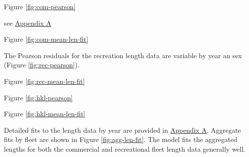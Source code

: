 \documentclass[11pt,
  english,
  a4paper,
]{article}
\begin{document}
Figure \ref{fig:com-pearson}

\leavevmode\tagmcend\tagstructend\par


see {\protect\hyperlink{append_aux5cux2520forux5cux2520details}{Appendix A}\leavevmode\tagmcend\tagstructend}

\leavevmode\tagmcend\tagstructend\par


Figure \ref{fig:com-mean-len-fit}

\leavevmode\tagmcend\tagstructend\par


The Pearson residuals for the recreation length data are variable by year an sex (Figure \ref{fig:rec-pearson}).

\leavevmode\tagmcend\tagstructend\par


Figure \ref{fig:rec-mean-len-fit}

\leavevmode\tagmcend\tagstructend\par


Figure \ref{fig:hkl-pearson}

\leavevmode\tagmcend\tagstructend\par


Figure \ref{fig:hkl-mean-len-fit}

\leavevmode\tagmcend\tagstructend\par


Detailed fits to the length data by year are provided in {\protect\hyperlink{append_a}{Appendix A}\leavevmode\tagmcend\tagstructend}. Aggregate fits by fleet are shown in Figure \ref{fig:agg-len-fit}. The model fits the aggregated lengths for both the commercial and recreational fleet length data generally well.

\leavevmode\tagmcend\tagstructend\par
\end{document}
